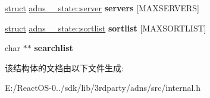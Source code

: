 \begin{DoxyCompactItemize}
\item 
\mbox{\label{structadns____state_a66632f9a298b3b527e9d52ec3fb3e5bb}} 
\hyperlink{interfacestruct}{struct} \hyperlink{structadns____state_1_1server}{adns\+\_\+\+\_\+state\+::server} {\bfseries servers} \mbox{[}M\+A\+X\+S\+E\+R\+V\+E\+RS\mbox{]}
\item 
\mbox{\label{structadns____state_a859329094ac40a8814f53e6d28343620}} 
\hyperlink{interfacestruct}{struct} \hyperlink{structadns____state_1_1sortlist}{adns\+\_\+\+\_\+state\+::sortlist} {\bfseries sortlist} \mbox{[}M\+A\+X\+S\+O\+R\+T\+L\+I\+ST\mbox{]}
\item 
\mbox{\label{structadns____state_afc2c4a13610a85513e053efeb9cd67a0}} 
char $\ast$$\ast$ {\bfseries searchlist}
\end{DoxyCompactItemize}


该结构体的文档由以下文件生成\+:\begin{DoxyCompactItemize}
\item 
E\+:/\+React\+O\+S-\/0../sdk/lib/3rdparty/adns/src/internal.\+h\end{DoxyCompactItemize}
